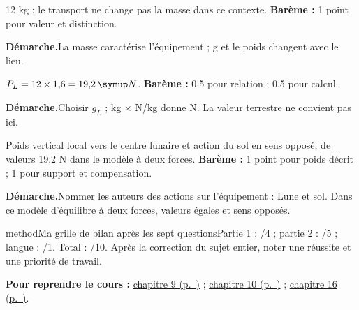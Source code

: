 \label{cor-bb-4}
\par\noindent\begin{minipage}{\linewidth}
12 kg : le transport ne change pas la masse dans ce contexte. \textbf{Barème :} 1 point pour valeur et distinction.\par
\smallskip\noindent\textbf{Démarche.}\enspace La masse caractérise l’équipement ; g et le poids changent avec le lieu.\par
\end{minipage}\par
\par\noindent\begin{minipage}{\linewidth}
$P_L=12\times1{,}6=19{,}2\unite N$. \textbf{Barème :} 0,5 pour relation ; 0,5 pour calcul.\par
\smallskip\noindent\textbf{Démarche.}\enspace Choisir $g_L$ ; kg × N/kg donne N. La valeur terrestre ne convient pas ici.\par
\end{minipage}\par
\par\noindent\begin{minipage}{\linewidth}
Poids vertical local vers le centre lunaire et action du sol en sens opposé, de valeurs 19,2 N dans le modèle à deux forces. \textbf{Barème :} 1 point pour poids décrit ; 1 pour support et compensation.\par
\smallskip\noindent\textbf{Démarche.}\enspace Nommer les auteurs des actions sur l’équipement : Lune et sol. Dans ce modèle d’équilibre à deux forces, valeurs égales et sens opposés.\par
{}
\end{minipage}\par
\par\noindent\begin{minipage}{\linewidth}
\begin{pcEncadre}{method}{Ma grille de bilan après les sept questions}Partie 1 : /4 ; partie 2 : /5 ; langue : /1. Total : /10. Après la correction du sujet entier, noter une réussite et une priorité de travail.\end{pcEncadre}
{\small\textbf{Pour reprendre le cours : }\hyperref[chap-9]{chapitre 9 (p.~\pageref*{chap-9})} ; \hyperref[chap-10]{chapitre 10 (p.~\pageref*{chap-10})} ; \hyperref[chap-16]{chapitre 16 (p.~\pageref*{chap-16})}.\par}\end{minipage}\par
